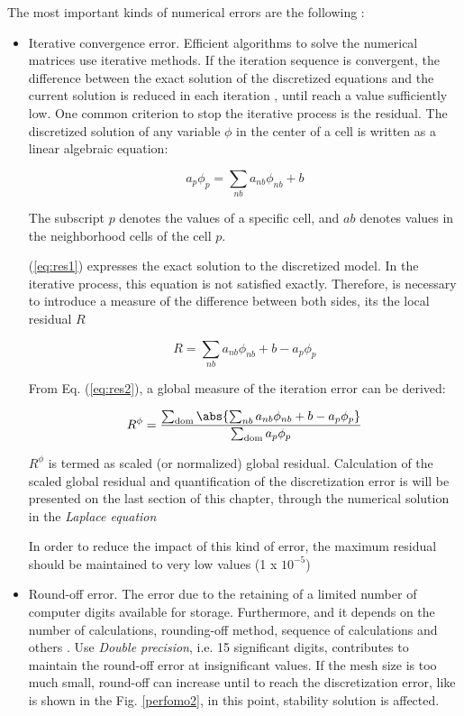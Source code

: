 The most important kinds of numerical errors are the following \cite{Roy2007} :
\begin{itemize}
\item Iterative convergence error. Efficient algorithms to solve the numerical matrices use iterative methods.  If the iteration sequence is convergent, the difference between the exact solution of the discretized equations and the current solution is reduced in each iteration \cite{Versteeg}, until reach a value sufficiently low. One common criterion  to stop the iterative process is the residual. The discretized solution of any variable $\phi$ in the center of a cell is written as a linear algebraic equation:   

\begin{equation}
a_p\phi_p=\sum_{nb} a_{nb}\phi_{nb} +b
\label{eq:res1}
\end{equation}

The subscript $p$ denotes the values of a specific cell, and $ab$ denotes values in the neighborhood cells of the cell $p$.

(\ref{eq:res1}) expresses the exact solution to the discretized model. In the iterative process, this equation is not satisfied exactly. Therefore, is necessary to introduce a measure of the difference between both sides, its the local residual $R$ 

\begin{equation}
R=\sum_{nb} a_{nb}\phi_{nb} +b-a_p\phi_p
\label{eq:res2}
\end{equation}

From Eq. (\ref{eq:res2}), a global measure of the iteration error can be derived: 

\begin{equation}
R^{\phi}=\frac{\sum_{\text{dom}} \abs{\sum_{nb} a_{nb}\phi_{nb} +b-a_p\phi_p}}{\sum_{\text{dom}}a_p \phi_p}
\end{equation}

$R^\phi$ is termed as scaled (or normalized) global residual. Calculation of the scaled global residual and quantification of the discretization error is will be presented on the last section of this chapter, through the numerical solution in the \textit{Laplace equation}

In order to reduce the impact of this kind of error, the maximum residual should be maintained to very low values (1 x $10^{-5}$)
 
\item Round-off error. The error due to the retaining of a limited number of computer digits available for storage. Furthermore, and it depends on the number of calculations, rounding-off method, sequence of calculations and others \cite{Tu}. Use 
\textit{Double precision}, i.e. 15 significant digits, contributes to maintain the  round-off error at insignificant values. If the mesh size is too much small,  round-off can increase until to reach the discretization error, like is shown in the Fig. \ref{perfomo2}, in this point, stability solution is affected.     


\end{itemize}
